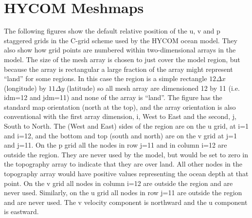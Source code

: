 


\section*{HYCOM Meshmaps}

The following figures show the default relative position of the u, v and p 
staggered grids in the C-grid scheme used by the HYCOM ocean model.  
They also show how grid points are numbered within two-dimensional arrays 
in the model.  
The size of the mesh array is chosen to just cover the model region, but 
because the array is rectangular a large fraction of the array might 
represent ``land'' for some regions.  
In this case the region is a simple rectangle  $12 \Delta x$ (longitude) 
by $11 \Delta y$ (latitude) so all mesh array are dimensioned 12 by 11 
(i.e. idm=12 and jdm=11) and none of the array is ``land''. 
The figure has the standard map orientation (north at the top), and
the array orientation is also conventional with the first array dimension, 
i, West to East and the second, j, South to North.
The (West and East) sides of the region are on the u grid, at i=1 and 
i=12, and the bottom and top (south and north) are on the v grid at j=1 
and j=11.  
On the p grid all the nodes in row j=11 and in column i=12 are outside 
the region.  They are never used by the model, but would be set to zero 
in the topography array to indicate that they are over land.  
All other nodes in the topography array would have positive values 
representing the ocean depth at that point.
On the v grid all nodes in column i=12 are outside the region and are never
used.  
Similarly, on the u grid all nodes in row j=11 are outside the region and 
are never used.
The v velocity component is northward and the u component is eastward.

